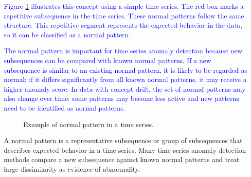 \textcolor{blue}{Figure \ref{fig222} illustrates this concept using a simple time series. The red box marks a repetitive subsequence in the time series. These normal patterns follow the same structure. This repetitive segment represents the expected behavior in the data, so it can be classified as a normal pattern.}

\textcolor{blue}{The normal pattern is important for time series anomaly detection because new subsequences can be compared with known normal patterns. If a new subsequence is similar to an existing normal pattern, it is likely to be regarded as normal; if it differs significantly from all known normal patterns, it may receive a higher anomaly score. In data with concept drift, the set of normal patterns may also change over time: some patterns may become less active and new patterns need to be identified as normal patterns.}


\begin{figure}[H]
    \centering
    \caption{Example of normal pattern in a time series.}
    \label{fig222}
\end{figure}

A normal pattern is a representative subsequence or group of subsequences that describes expected behavior in a time series. Many time-series anomaly detection methods compare a new subsequence against known normal patterns and treat large dissimilarity as evidence of abnormality.

